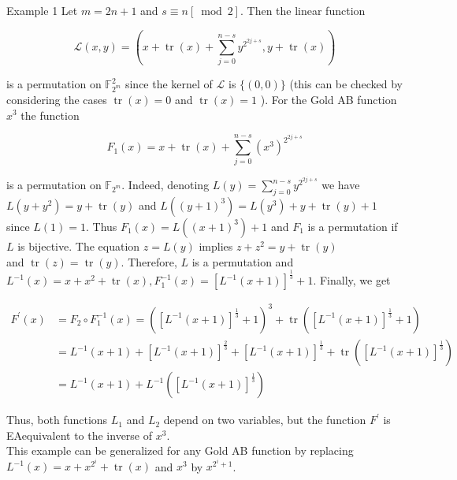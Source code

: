 \documentclass[10pt]{article}
\begin{document}
Example 1 Let $m=2 n+1$ and $s \equiv n[\bmod 2]$. Then the linear function

$$
\mathcal{L}(x, y)=\left(x+\operatorname{tr}(x)+\sum_{j=0}^{n-s} y^{2^{2 j+s}}, y+\operatorname{tr}(x)\right)
$$

is a permutation on $\mathbb{F}_{2^{m}}^{2}$ since the kernel of $\mathcal{L}$ is $\{(0,0)\}$ (this can be checked by considering the cases $\operatorname{tr}(x)=0$ and $\operatorname{tr}(x)=1$ ). For the Gold AB function $x^{3}$ the function

$$
F_{1}(x)=x+\operatorname{tr}(x)+\sum_{j=0}^{n-s}\left(x^{3}\right)^{2^{2 j+s}}
$$

is a permutation on $\mathbb{F}_{2^{m}}$. Indeed, denoting $L(y)=\sum_{j=0}^{n-s} y^{2^{2 j+s}}$ we have $L\left(y+y^{2}\right)=y+\operatorname{tr}(y)$ and $L\left((y+1)^{3}\right)=L\left(y^{3}\right)+y+\operatorname{tr}(y)+1$ since $L(1)=1$. Thus $F_{1}(x)=L\left((x+1)^{3}\right)+1$ and $F_{1}$ is a permutation if $L$ is bijective. The equation $z=L(y)$ implies $z+z^{2}=y+\operatorname{tr}(y)$\\
and $\operatorname{tr}(z)=\operatorname{tr}(y)$. Therefore, $L$ is a permutation and $L^{-1}(x)=x+x^{2}+\operatorname{tr}(x), F_{1}^{-1}(x)= \left[L^{-1}(x+1)\right]^{\frac{1}{3}}+1$. Finally, we get

$$
\begin{aligned}
F^{\prime}(x) & =F_{2} \circ F_{1}^{-1}(x)=\left(\left[L^{-1}(x+1)\right]^{\frac{1}{3}}+1\right)^{3}+\operatorname{tr}\left(\left[L^{-1}(x+1)\right]^{\frac{1}{3}}+1\right) \\
& =L^{-1}(x+1)+\left[L^{-1}(x+1)\right]^{\frac{2}{3}}+\left[L^{-1}(x+1)\right]^{\frac{1}{3}}+\operatorname{tr}\left(\left[L^{-1}(x+1)\right]^{\frac{1}{3}}\right) \\
& =L^{-1}(x+1)+L^{-1}\left(\left[L^{-1}(x+1)\right]^{\frac{1}{3}}\right)
\end{aligned}
$$

Thus, both functions $L_{1}$ and $L_{2}$ depend on two variables, but the function $F^{\prime}$ is EAequivalent to the inverse of $x^{3}$.\\
This example can be generalized for any Gold AB function by replacing $L^{-1}(x)=x+x^{2^{i}}+ \operatorname{tr}(x)$ and $x^{3}$ by $x^{2^{i}+1}$.
\end{document}
